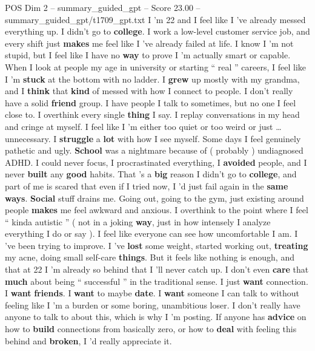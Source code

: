 \begin{textsample}{POS Dim 2 – summary\_guided\_gpt – Score 23.00 – summary\_guided\_gpt/t1709\_gpt.txt}  \label{ex:f2_pos_011}
I ’m 22 and I feel like I ’ve already messed everything up.
I didn't go to \textbf{college}.
I work a low-level customer service job, and every shift just \textbf{makes} me feel like I ’ve already failed at life.
I know I ’m not stupid, but I feel like I have no \textbf{way} to prove I ’m actually smart or capable.
When I look at people my age in university or starting “ real ” careers, I feel like I ’m \textbf{stuck} at the bottom with no ladder.
I \textbf{grew} up mostly with my grandma, and I \textbf{think} that \textbf{kind} of messed with how I connect to people.
I don't really have a solid \textbf{friend} group.
I have people I talk to sometimes, but no one I feel close to.
I overthink every single \textbf{thing} I say.
I replay conversations in my head and cringe at myself.
I feel like I ’m either too quiet or too weird or just … unnecessary.
I \textbf{struggle} a \textbf{lot} with how I see myself.
Some days I feel genuinely pathetic and ugly. \textbf{School} was a nightmare because of ( probably ) undiagnosed ADHD.
I could never focus, I procrastinated everything, I \textbf{avoided} people, and I never \textbf{built} any \textbf{good} habits.
That ’s a \textbf{big} reason I didn't go to \textbf{college}, and part of me is scared that even if I tried now, I ’d just fail again in the \textbf{same} \textbf{ways}. \textbf{Social} stuff drains me.
Going out, going to the gym, just existing around people \textbf{makes} me feel awkward and anxious.
I overthink to the point where I feel “ kinda autistic ” ( not in a joking \textbf{way}, just in how intensely I analyze everything I do or say ).
I feel like everyone can see how uncomfortable I am.
I ’ve been trying to improve.
I ’ve \textbf{lost} some weight, started working out, \textbf{treating} my acne, doing small self-care \textbf{things}.
But it feels like nothing is enough, and that at 22 I ’m already so behind that I ’ll never catch up.
I don't even \textbf{care} that \textbf{much} about being “ successful ” in the traditional sense.
I just \textbf{want} connection.
I \textbf{want} \textbf{friends}.
I \textbf{want} to maybe \textbf{date}.
I \textbf{want} someone I can talk to without feeling like I ’m a burden or some boring, unambitious loser.
I don't really have anyone to talk to about this, which is why I ’m posting.
If anyone has \textbf{advice} on how to \textbf{build} connections from basically zero, or how to \textbf{deal} with feeling this behind and \textbf{broken}, I ’d really appreciate it.

\end{textsample}
